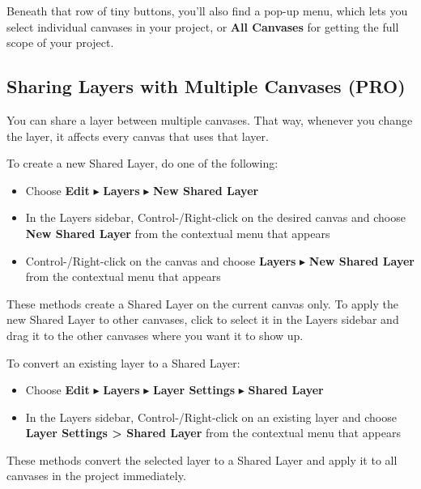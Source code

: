 \documentclass[../main.tex]{subfiles}
\begin{document}
Beneath that row of tiny buttons, you'll also find a pop-up menu, which lets you select
individual canvases in your project, or \textbf{All Canvases} for getting the full scope of
your project.


\subsection{Sharing Layers with Multiple Canvases (\texorpdfstring{\textbf{PRO}}{PRO})}

\begin{ogpro}
  You can share a layer between multiple canvases. That way, whenever you change the layer, it
  affects every canvas that uses that layer.

  To create a new Shared Layer, do one of the following:

  \begin{itemize}
    \item Choose \textbf{Edit} $\blacktriangleright$ \textbf{Layers} $\blacktriangleright$
      \textbf{New Shared Layer}
    \item In the Layers sidebar, Control-/Right-click on the desired canvas and choose
      \textbf{New Shared Layer} from the contextual menu that appears
    \item Control-/Right-click on the canvas and choose \textbf{Layers} $\blacktriangleright$
      \textbf{New Shared Layer} from the contextual menu that appears
  \end{itemize}

  These methods create a Shared Layer on the current canvas only. To apply the new Shared Layer
  to other canvases, click to select it in the Layers sidebar and drag it to the other
  canvases where you want it to show up.

  To convert an existing layer to a Shared Layer:

  \begin{itemize}
    \item Choose \textbf{Edit} $\blacktriangleright$ \textbf{Layers} $\blacktriangleright$
      \textbf{Layer Settings} $\blacktriangleright$ \textbf{Shared Layer}
    \item In the Layers sidebar, Control-/Right-click on an existing layer and choose
      \textbf{Layer Settings > Shared Layer} from the contextual menu that appears
  \end{itemize}

  These methods convert the selected layer to a Shared Layer and apply it to all canvases in the
  project immediately.


\end{ogpro}
\end{document}
